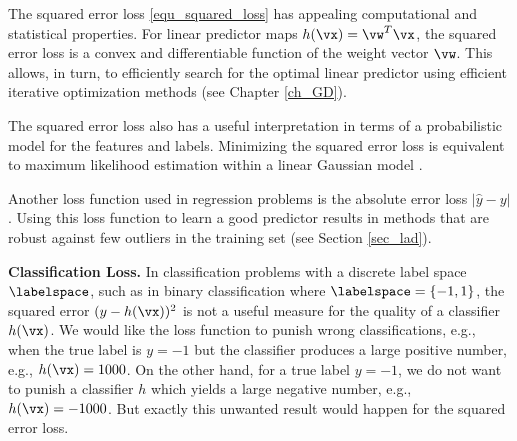 \documentclass[12pt]{report}
\begin{document}
The squared error loss \eqref{equ_squared_loss} has appealing 
computational and statistical properties. For linear predictor 
maps $h(\vx) = \vw^{T} \vx$, the squared error loss is a 
convex and differentiable function of the weight vector $\vw$. 
This allows, in turn, to efficiently search for the optimal linear 
predictor using efficient iterative optimization methods (see Chapter \ref{ch_GD}). 

The squared error loss also has a useful interpretation in 
terms of a probabilistic model for the features and labels. 
Minimizing the squared error loss is equivalent to maximum 
likelihood estimation within a linear Gaussian model \cite[Sec. 2.6.3]{hastie01statisticallearning}. 

Another loss function used in regression problems is the absolute 
error loss $|\hat{y} - y|$. Using this loss function to learn a good 
predictor results in methods that are robust against few outliers in 
the training set (see Section \ref{sec_lad}).  

{\bf Classification Loss.} In classification problems with a 
discrete label space $\labelspace$, such as in binary classification 
where $\labelspace = \{-1,1\}$, the squared error $(y - h(\vx))^2$ 
is not a useful measure for the quality of a classifier $h(\vx)$. 
We would like the loss function to punish wrong classifications, 
e.g., when the true label is $y=-1$ but the classifier produces a 
large positive number, e.g., $h(\vx) = 1000$. On the other hand, 
for a true label $y=-1$, we do not want to punish a classifier $h$ 
which yields a large negative number, e.g., $h(\vx) = -1000$. But 
exactly this unwanted result would happen for the squared error 
loss. 
\end{document}
